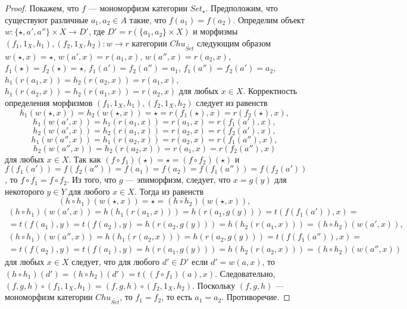 \documentclass[a4paper,12pt]{article}
\begin{document}
\begin{proof}
    Покажем, что $f$ --- мономорфизм категории $Set_{\star}$. Предположим, что существуют различные $a_1, a_2 \in A$ такие, что $f(a_1) = f(a_2)$. Определим объект $w: \{\star,a',a''\} \times X \to D'$, где $D' = r(\{a_1,a_2\} \times X)$ и морфизмы $(f_1,1_X,h_1), (f_2,1_X,h_2): w \to r$ категории $Chu_{\widetilde{Set}}$ следующим образом $w(\star,x) = \star$, $w(a',x) = r(a_1,x)$, $w(a'',x) = r(a_2,x)$, $f_1(\star) = f_2(\star) = \star$, $f_1(a') = f_2(a'') = a_1$, $f_1(a'') = f_2(a') = a_2$, $h_1(r(a_1,x)) = h_2(r(a_2,x)) = r(a_1,x)$, $h_1(r(a_2,x)) = h_2(r(a_1,x)) = r(a_2,x)$ для любых $x \in X$. Корректность определения морфизмов $(f_1,1_X,h_1), (f_2,1_X,h_2)$ следует из равенств
    $$
        h_1(w(\star,x)) = h_2(w(\star,x)) = \star = r(f_1(\star),x) = r(f_2(\star),x),
    $$
    $$
        h_1(w(a',x)) = h_1(r(a_1,x)) = r(a_1,x) = r(f_1(a'),x),
    $$
    $$
        h_2(w(a',x)) = h_2(r(a_1,x)) = r(a_2,x) = r(f_2(a'),x),
    $$
    $$
        h_1(w(a'',x)) = h_1(r(a_2,x)) = r(a_2,x) = r(f_1(a''),x),
    $$
    $$
        h_2(w(a'',x)) = h_2(r(a_2,x)) = r(a_1,x) = r(f_2(a''),x)
    $$
    для любых $x \in X$.
    Так как $(f \circ f_1)(\star) = \star = (f \circ f_2)(\star)$ и $f(f_1(a')) = f(f_2(a'')) = f(a_1) = f(a_2) = f(f_1(a'')) = f(f_2(a'))$,
    то $f \circ f_1 = f \circ f_2$. Из того, что $g$ --- эпиморфизм, следует, что $x = g(y)$ для некоторого $y \in Y$ для любого $x \in X$. Тогда из равенств
    $$
        (h \circ h_1)(w(\star,x)) = \star = (h \circ h_2)(w(\star,x)),
    $$
    \begin{multline*}
        (h \circ h_1)(w(a',x)) = h(h_1(r(a_1,x))) = h(r(a_1,g(y))) = t(f(f_1(a')),x)  =\\= 
        t(f(a_1),y) = t(f(a_2),y) = h(r(a_2,g(y))) = h(h_2(r(a_1,x))) = (h \circ h_2)(w(a',x)),
    \end{multline*}
    \begin{multline*}
        (h \circ h_1)(w(a'',x)) = h(h_1(r(a_2,x))) = h(r(a_2,g(y))) = t(f(f_1(a'')),x)  =\\= 
        t(f(a_2),y) = t(f(a_1),y) = h(r(a_1,g(y))) = h(h_2(r(a_2,x))) = (h \circ h_2)(w(a'',x))
    \end{multline*}
    для любых $x \in X$ следует, что для любого $d' \in D'$ если $d' = w(a,x)$, то $(h \circ h_1)(d') = (h \circ h_2)(d') = t((f \circ f_1)(a),x)$. Следовательно, $(f,g,h) \circ (f_1,1_X,h_1) = (f,g,h) \circ (f_2,1_X,h_2)$. Поскольку $(f,g,h)$ --- мономорфизм категории $Chu_{\widetilde{Set}}$, то $f_1 = f_2$, то есть $a_1 = a_2$. Противоречие.


\end{proof}
\end{document}
